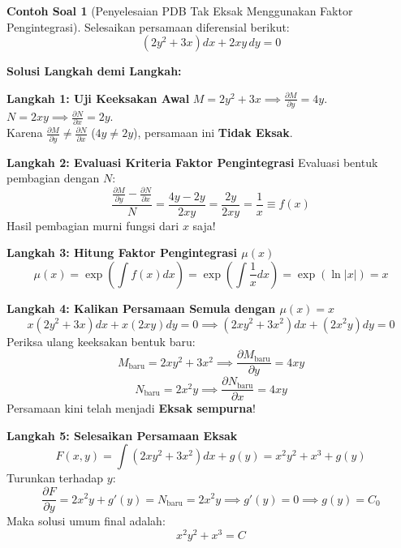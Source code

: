 \documentclass[11pt,a4paper]{article}
\theoremstyle{definition}
\newtheorem{example}{Contoh Soal}[section]
\begin{document}
\begin{example}[Penyelesaian PDB Tak Eksak Menggunakan Faktor Pengintegrasi]
Selesaikan persamaan diferensial berikut:
\begin{equation}
    (2y^2 + 3x) dx + 2xy \, dy = 0
\end{equation}

\textbf{Solusi Langkah demi Langkah:}

\textbf{Langkah 1: Uji Keeksakan Awal}
$M = 2y^2 + 3x \implies \frac{\partial M}{\partial y} = 4y$. \\
$N = 2xy \implies \frac{\partial N}{\partial x} = 2y$. \\
Karena $\frac{\partial M}{\partial y} \neq \frac{\partial N}{\partial x}$ ($4y \neq 2y$), persamaan ini \textbf{Tidak Eksak}.

\textbf{Langkah 2: Evaluasi Kriteria Faktor Pengintegrasi}
Evaluasi bentuk pembagian dengan $N$:
\begin{equation}
    \frac{\frac{\partial M}{\partial y} - \frac{\partial N}{\partial x}}{N} = \frac{4y - 2y}{2xy} = \frac{2y}{2xy} = \frac{1}{x} \equiv f(x)
\end{equation}
Hasil pembagian murni fungsi dari $x$ saja!

\textbf{Langkah 3: Hitung Faktor Pengintegrasi $\mu(x)$}
\begin{equation}
    \mu(x) = \exp\left( \int f(x) dx \right) = \exp\left( \int \frac{1}{x} dx \right) = \exp(\ln|x|) = x
\end{equation}

\textbf{Langkah 4: Kalikan Persamaan Semula dengan $\mu(x) = x$}
\begin{equation}
    x(2y^2 + 3x) dx + x(2xy) dy = 0 \implies (2xy^2 + 3x^2) dx + (2x^2 y) dy = 0
\end{equation}
Periksa ulang keeksakan bentuk baru:
\begin{equation}
    M_{\text{baru}} = 2xy^2 + 3x^2 \implies \frac{\partial M_{\text{baru}}}{\partial y} = 4xy
\end{equation}
\begin{equation}
    N_{\text{baru}} = 2x^2 y \implies \frac{\partial N_{\text{baru}}}{\partial x} = 4xy
\end{equation}
Persamaan kini telah menjadi \textbf{Eksak sempurna}!

\textbf{Langkah 5: Selesaikan Persamaan Eksak}
\begin{equation}
    F(x,y) = \int (2xy^2 + 3x^2) dx + g(y) = x^2 y^2 + x^3 + g(y)
\end{equation}
Turunkan terhadap $y$:
\begin{equation}
    \frac{\partial F}{\partial y} = 2x^2 y + g'(y) = N_{\text{baru}} = 2x^2 y \implies g'(y) = 0 \implies g(y) = C_0
\end{equation}
Maka solusi umum final adalah:
\begin{equation}
    x^2 y^2 + x^3 = C
\end{equation}
\end{example}
\end{document}
